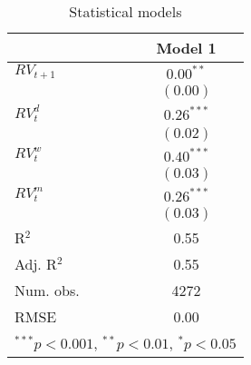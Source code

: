 
\begin{table}
\begin{center}
\begin{tabular}{l c }
\hline
 & Model 1 \\
\hline
$RV_{t+1}$   & $0.00^{**}$  \\
             & $(0.00)$     \\
$RV_{t}^{d}$ & $0.26^{***}$ \\
             & $(0.02)$     \\
$RV_{t}^{w}$ & $0.40^{***}$ \\
             & $(0.03)$     \\
$RV_{t}^{m}$ & $0.26^{***}$ \\
             & $(0.03)$     \\
\hline
R$^2$        & 0.55         \\
Adj. R$^2$   & 0.55         \\
Num. obs.    & 4272         \\
RMSE         & 0.00         \\
\hline
\multicolumn{2}{l}{\scriptsize{$^{***}p<0.001$, $^{**}p<0.01$, $^*p<0.05$}}
\end{tabular}
\caption{Statistical models}
\label{table:coefficients}
\end{center}
\end{table}
